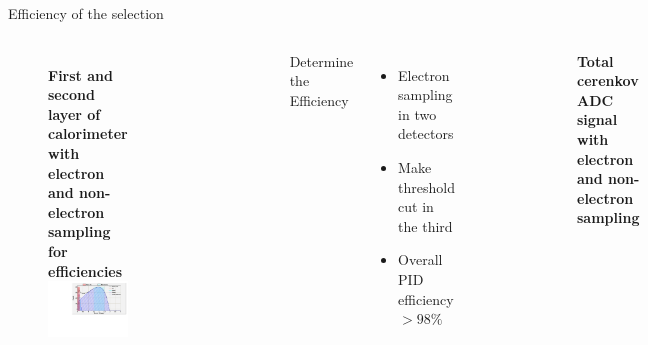 \documentclass{beamer}
\begin{document}
\begin{frame}{Efficiency of the selection}
	\vspace{-10pt}
	\begin{block}{}
		\begin{columns}
			\vspace{-18pt}
			\begin{figure}
				\textbf{First and second layer of calorimeter with electron and non-electron sampling for efficiencies }
				\includegraphics[width=4.50cm]{../images/Lprl1.pdf}
			\end{figure}
			\vspace{-23pt}
			\begin{figure}
				\includegraphics[width=4.50cm]{../images/Lprl2.pdf}
			\end{figure}
			Determine the Efficiency
			
			\begin{itemize}
				\item Electron sampling in two detectors
				\item Make threshold cut in the third
				\item Overall PID efficiency $> 98\% $
			\end{itemize}
			\vspace{-16pt}
			\begin{figure}
				\includegraphics[width=5.50cm]{../images/Lcerasum.pdf}
			\end{figure}
			\vspace{-16pt}
			\textbf{Total cerenkov ADC signal with electron and non-electron sampling}
		\end{columns}
	\end{block}
\end{frame}
\end{document}
